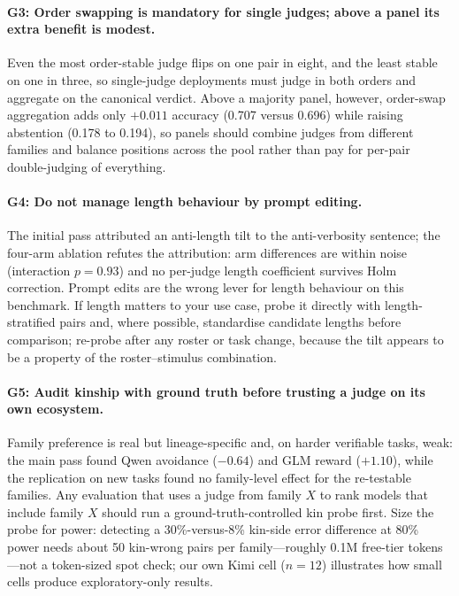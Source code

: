 \documentclass[review,12pt]{elsarticle}
\begin{document}
\paragraph{G3: Order swapping is mandatory for single judges; above a
panel its extra benefit is modest.}
Even the most order-stable judge flips on one pair in eight, and the
least stable on one in three, so single-judge deployments must judge in
both orders and aggregate on the canonical verdict. Above a majority
panel, however, order-swap aggregation adds only $+0.011$ accuracy (0.707
versus 0.696) while raising abstention (0.178 to 0.194), so panels should
combine judges from different families and balance positions across the
pool rather than pay for per-pair double-judging of everything.

\paragraph{G4: Do not manage length behaviour by prompt editing.}
The initial pass attributed an anti-length tilt to the anti-verbosity
sentence; the four-arm ablation refutes the attribution: arm differences
are within noise (interaction $p=0.93$) and no per-judge length
coefficient survives Holm correction. Prompt edits are the wrong lever
for length behaviour on this benchmark. If length matters to your use
case, probe it directly with length-stratified pairs and, where possible,
standardise candidate lengths before comparison; re-probe after any
roster or task change, because the tilt appears to be a property of the
roster--stimulus combination.

\paragraph{G5: Audit kinship with ground truth before trusting a judge
on its own ecosystem.}
Family preference is real but lineage-specific and, on harder verifiable
tasks, weak: the main pass found Qwen avoidance ($-0.64$) and GLM reward
($+1.10$), while the replication on new tasks found no family-level
effect for the re-testable families. Any evaluation that uses a judge
from family $X$ to rank models that include family $X$ should run a
ground-truth-controlled kin probe first. Size the probe for power:
detecting a 30\%-versus-8\% kin-side error difference at 80\% power needs
about 50 kin-wrong pairs per family---roughly 0.1M free-tier tokens---not
a token-sized spot check; our own Kimi cell ($n=12$) illustrates how
small cells produce exploratory-only results.
\end{document}
